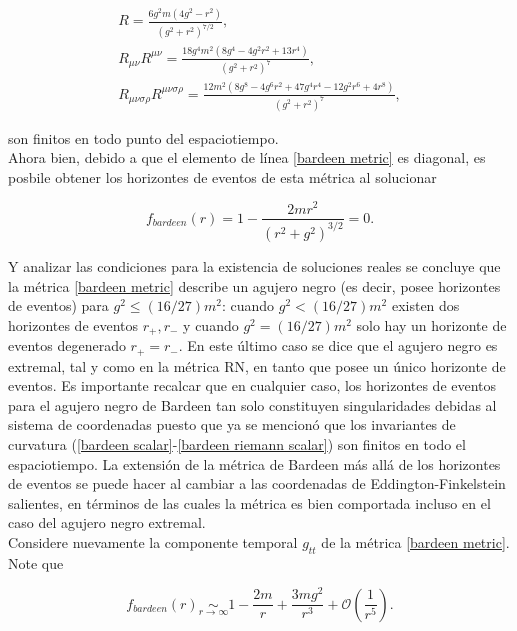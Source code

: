 \documentclass{article}
\numberwithin{equation}{section}
\theoremstyle{definition}
\begin{document}
\begin{equation}
\label{bardeen scalars}
\begin{gathered}
R = \frac{6 g^2 m \left(4 g^2-r^2\right)}{\left(g^2+r^2\right)^{7/2}},\\
R_{\mu \nu}R^{\mu \nu} = \frac{18 g^4 m^2 \left(8 g^4-4 g^2 r^2+13 r^4\right)}{\left(g^2+r^2\right)^7},\\
R_{\mu \nu \sigma \rho}R^{\mu \nu \sigma \rho} = \frac{12 m^2 \left(8 g^8-4 g^6 r^2+47 g^4 r^4-12 g^2 r^6+4 r^8\right)}{\left(g^2+r^2\right)^7},
\end{gathered}
\end{equation}

son finitos en todo punto  del espaciotiempo.\\

Ahora bien, debido a que el elemento de línea \eqref{bardeen metric} es diagonal, es posbile obtener los horizontes de eventos de esta métrica al solucionar

\begin{equation}
f_{bardeen}(r) = 1 - \frac{2mr^2}{(r^2 + g^2)^{3/2}} = 0.
\end{equation}

Y analizar las condiciones para la existencia de soluciones reales se concluye que la métrica \eqref{bardeen metric} describe un agujero negro (es decir, posee horizontes de eventos) para $g^2 \leq (16/27)m^2$: cuando $g^2 < (16/27)m^2$ existen dos horizontes de eventos $r_{+},r_{-}$ y cuando $g^2 = (16/27)m^2$ solo hay un horizonte de eventos degenerado $r_{+} = r_{-}$. En este último caso se dice que el agujero negro es extremal, tal y como en la métrica RN, en tanto que posee un único horizonte de eventos. Es importante recalcar que en cualquier caso, los horizontes de eventos para el agujero negro de Bardeen tan solo constituyen singularidades debidas al sistema de coordenadas puesto que ya se mencionó que los invariantes de curvatura (\ref{bardeen scalar}-\ref{bardeen riemann scalar}) son finitos en todo el espaciotiempo. La extensión de la métrica de Bardeen más allá de los horizontes de eventos se puede hacer al cambiar a las coordenadas de Eddington-Finkelstein salientes, en términos de las cuales la métrica es bien comportada incluso en el caso del agujero negro extremal. \\

Considere nuevamente la componente temporal $g_{tt}$ de la métrica \eqref{bardeen metric}. Note que

\begin{equation}
f_{bardeen}(r) \underset{r \to \infty}{\sim} 1 - \frac{2m}{r} + \frac{3mg^2}{r^3} + \mathcal{O}\left( \frac{1}{r^5} \right).
\end{equation}
\end{document}
